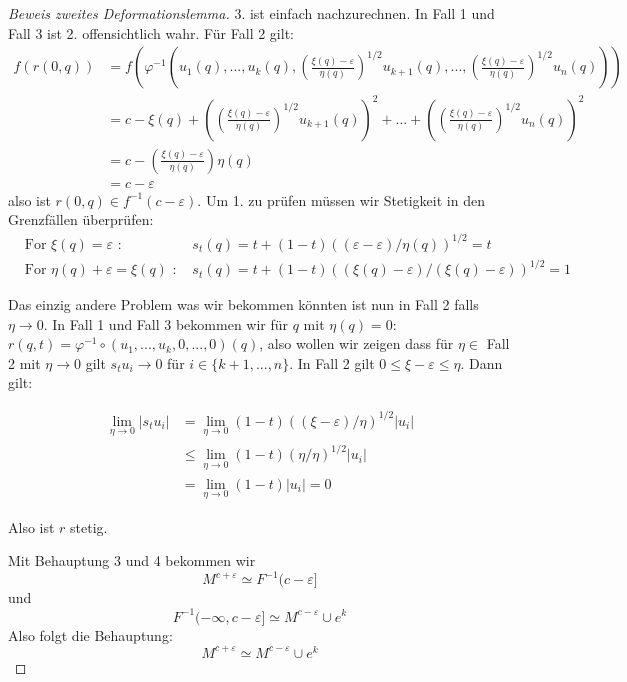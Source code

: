 \begin{proof}[Beweis zweites Deformationslemma]
    3. ist einfach nachzurechnen. In Fall 1 und Fall 3 ist 2. offensichtlich
    wahr. Für Fall 2 gilt:
    \begin{align*} 
        f(r(0, q)) & = 
            f\left( \varphi^{-1} \left(u_1(q), ..., u_k(q), 
            \left( \frac{\xi(q) - \varepsilon}{\eta(q)} \right)^{1/2}u_{k + 1}(q), ...,
            \left( \frac{\xi(q) - \varepsilon}{\eta(q)} \right)^{1/2}u_n(q)
            \right)
            \right) \\
        & = c - \xi(q)
            + \left( \left( \frac{\xi(q) - \varepsilon}{\eta(q)} \right)^{1/2}u_{k + 1}(q) \right)^2 + ... 
            + \left( \left( \frac{\xi(q) - \varepsilon}{\eta(q)} \right)^{1/2}u_n(q) \right)^2 \\
        & = c - \left( \frac{\xi(q) - \varepsilon}{\eta(q)} \right) \eta(q) \\
        & = c - \varepsilon
    \end{align*}
    also ist $r(0, q) \in f^{-1}(c - \varepsilon)$. Um 1. zu prüfen müssen wir 
    Stetigkeit in den Grenzfällen überprüfen:
    \begin{align*}
        & \text{For } \xi(q) = \varepsilon \text{ : }
            & s_t(q)  =t + (1 - t)((\varepsilon - \varepsilon)/\eta(q))^{1/2} = t \\
        & \text{For } \eta(q) + \varepsilon = \xi(q) \text{ : }
            & s_t(q) = t + (1 - t)((\xi(q) - \varepsilon)/(\xi(q) - \varepsilon))^{1/2} = 1
    \end{align*}

    Das einzig andere Problem was wir bekommen könnten ist nun in Fall 2 falls
    $\eta \to 0$. In Fall 1 und Fall 3 bekommen wir für $q$ mit $\eta(q) = 0$:
    $r(q, t) = \varphi^{-1} \circ (u_1, ..., u_k, 0, ..., 0)(q)$, also wollen
    wir zeigen dass für $\eta \in $ Fall 2 mit $\eta \to 0$ gilt $s_tu_i \to 0$
    für $i \in \{k+1, ..., n\}$. In Fall 2 gilt
    $0 \leq \xi - \varepsilon \leq \eta$. Dann gilt:

    \begin{align*}
        \lim\limits_{\eta \to 0} | s_t u_i |
           & = \lim\limits_{\eta \to 0} (1 - t)((\xi - \varepsilon)/\eta)^{1/2} | u_i | \\
           & \leq \lim\limits_{\eta \to 0} (1 - t)(\eta/\eta)^{1/2}|u_i| \\
           & = \lim\limits_{\eta \to 0} (1 - t)|u_i| = 0 
    \end{align*}
    
    Also ist $r$ stetig.
    \sectiondone

    Mit Behauptung 3 und 4 bekommen wir
    \[ M^{c + \varepsilon} \simeq F^{-1}(c - \varepsilon] \]
    und 
    \[ F^{-1}(-\infty, c - \varepsilon] \simeq M^{c - \varepsilon} \cup e^k \]
    Also folgt die Behauptung:
    \[ M^{c + \varepsilon} \simeq M^{c - \varepsilon} \cup e^k \]

\end{proof}
